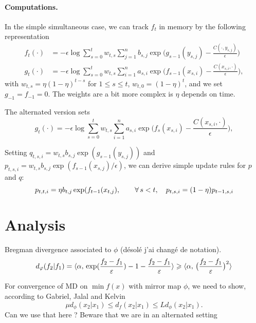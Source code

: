 \documentclass[a4paper, 10pt]{article}
\begin{document}
\paragraph{Computations.} In the simple simultaneous case, we can track $f_t$ in memory by the following representation
\begin{align}
    f_t(\cdot) &= - \epsilon \log \sum_{s=0}^t w_{t,s} \sum_{j=1}^n b_{s, j} 
    \exp\Big(g_{s-1}(y_{s,j}) - \frac{C(\cdot, y_{s, j})}{\epsilon}\Big) \\
    g_t(\cdot) &= - \epsilon \log \sum_{s=0}^t w_{t,s} \sum_{i=1}^n a_{s, i} 
    \exp\Big(f_{s-1}(x_{s, i}) - \frac{C(x_{s,i}, \cdot)}{\epsilon}\Big),
\end{align}
with $w_{t,s} = \eta (1-\eta)^{t-s}$ for $1 \leq s \leq t$, $w_{t,0} =
(1-\eta)^{t}$, and we set $g_{-1} = f_{-1} = 0$. The weights are a bit more
complex is $\eta$ depends on time.

The alternated version sets
\begin{equation}
    g_t(\cdot) = - \epsilon \log \sum_{s=0}^t w_{t,s} \sum_{i=1}^n a_{s, i} 
    \exp\Big(f_{s}(x_{s, i}) - \frac{C(x_{s,i}, \cdot)}{\epsilon}\Big),
\end{equation}

Setting $q_{t,s,i} = w_{t,s} b_{s, j} \exp(g_{s-1}(y_{s,
j}))$ and $p_{t,s,i} = w_{t,s} b_{s, j} \exp(f_{s-1}(x_{s, j})/ \epsilon)$, we can derive
simple update rules for $p$ and $q$:
\begin{equation}
    p_{t,t, i} = \eta b_{t,j} \exp(f_{t-1}(x_{t, j}),
    \qquad \forall \, s < t,\quad p_{t,s, i} = (1- \eta) p_{t-1,s, i}
\end{equation}


\section{Analysis}

Bregman divergence associated to $\phi$ (désolé j'ai changé de notation).
\begin{equation}
    d_{\varphi}(f_2|f_1) = \langle \alpha,\,\exp(\frac{f_2-f_1}{\varepsilon})
     - 1 - \frac{f_2-f_1}{\varepsilon}\rangle
      \geqslant \langle \alpha,\,\big(\frac{f_2-f_1}{\varepsilon}\big)^2\rangle
\end{equation}

For convergence of MD on $\min f(x)$ with mirror map $\phi$, we need to show, according to Gabriel, Jalal and Kelvin
\begin{equation}
    \mu d_\phi(x_2|x_1 )\leq d_f(x_2|x_1) \leq L d_\phi(x_2|x_1).
\end{equation}
Can we use that here ? Beware that we are in an alternated setting
\end{document}
